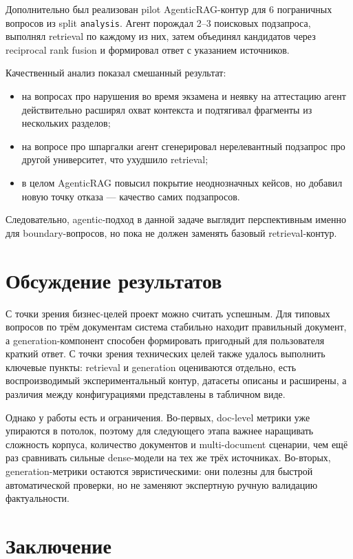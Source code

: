 \documentclass[12pt,a4paper]{article}
\begin{document}
Дополнительно был реализован pilot AgenticRAG-контур для 6 пограничных вопросов из split \texttt{analysis}. Агент порождал 2--3 поисковых подзапроса, выполнял retrieval по каждому из них, затем объединял кандидатов через reciprocal rank fusion и формировал ответ с указанием источников.

Качественный анализ показал смешанный результат:
\begin{itemize}
    \item на вопросах про нарушения во время экзамена и неявку на аттестацию агент действительно расширял охват контекста и подтягивал фрагменты из нескольких разделов;
    \item на вопросе про шпаргалки агент сгенерировал нерелевантный подзапрос про другой университет, что ухудшило retrieval;
    \item в целом AgenticRAG повысил покрытие неоднозначных кейсов, но добавил новую точку отказа --- качество самих подзапросов.
\end{itemize}

Следовательно, agentic-подход в данной задаче выглядит перспективным именно для boundary-вопросов, но пока не должен заменять базовый retrieval-контур.

\section{Обсуждение результатов}

С точки зрения бизнес-целей проект можно считать успешным. Для типовых вопросов по трём документам система стабильно находит правильный документ, а generation-компонент способен формировать пригодный для пользователя краткий ответ. С точки зрения технических целей также удалось выполнить ключевые пункты: retrieval и generation оцениваются отдельно, есть воспроизводимый экспериментальный контур, датасеты описаны и расширены, а различия между конфигурациями представлены в табличном виде.

Однако у работы есть и ограничения. Во-первых, doc-level метрики уже упираются в потолок, поэтому для следующего этапа важнее наращивать сложность корпуса, количество документов и multi-document сценарии, чем ещё раз сравнивать сильные dense-модели на тех же трёх источниках. Во-вторых, generation-метрики остаются эвристическими: они полезны для быстрой автоматической проверки, но не заменяют экспертную ручную валидацию фактуальности.

\section{Заключение}
\end{document}
